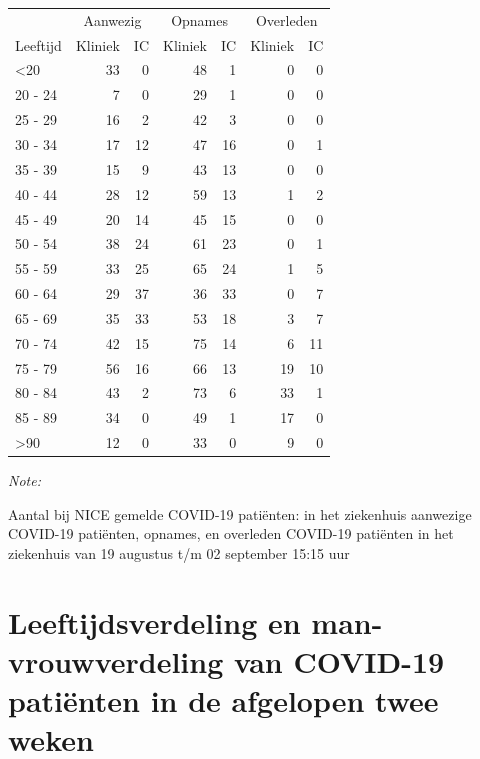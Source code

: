 \documentclass[
  english,
  man,floatsintext]{apa6}
\begin{document}
\begin{table}
\centering\begingroup\fontsize{10}{12}\selectfont

\begin{threeparttable}
\begin{tabular}{lrrrrrr}
\toprule
\multicolumn{1}{c}{ } & \multicolumn{2}{c}{Aanwezig} & \multicolumn{2}{c}{Opnames} & \multicolumn{2}{c}{Overleden} \\
\cmidrule(l{3pt}r{3pt}){2-3} \cmidrule(l{3pt}r{3pt}){4-5} \cmidrule(l{3pt}r{3pt}){6-7}
Leeftijd & Kliniek & IC & Kliniek & IC & Kliniek & IC\\
\midrule
<20 & 33 & 0 & 48 & 1 & 0 & 0\\
20 - 24 & 7 & 0 & 29 & 1 & 0 & 0\\
25 - 29 & 16 & 2 & 42 & 3 & 0 & 0\\
30 - 34 & 17 & 12 & 47 & 16 & 0 & 1\\
35 - 39 & 15 & 9 & 43 & 13 & 0 & 0\\
40 - 44 & 28 & 12 & 59 & 13 & 1 & 2\\
45 - 49 & 20 & 14 & 45 & 15 & 0 & 0\\
50 - 54 & 38 & 24 & 61 & 23 & 0 & 1\\
55 - 59 & 33 & 25 & 65 & 24 & 1 & 5\\
60 - 64 & 29 & 37 & 36 & 33 & 0 & 7\\
65 - 69 & 35 & 33 & 53 & 18 & 3 & 7\\
70 - 74 & 42 & 15 & 75 & 14 & 6 & 11\\
75 - 79 & 56 & 16 & 66 & 13 & 19 & 10\\
80 - 84 & 43 & 2 & 73 & 6 & 33 & 1\\
85 - 89 & 34 & 0 & 49 & 1 & 17 & 0\\
>90 & 12 & 0 & 33 & 0 & 9 & 0\\
\bottomrule
\end{tabular}
\begin{tablenotes}
\item \textit{Note: } 
\item Aantal bij NICE gemelde COVID-19 patiënten: in het ziekenhuis aanwezige COVID-19 patiënten, opnames, en overleden COVID-19 patiënten in het ziekenhuis van 19 augustus t/m 02 september 15:15 uur
\end{tablenotes}
\end{threeparttable}
\endgroup{}
\end{table}

\newpage

\hypertarget{leeftijdsverdeling-en-man-vrouwverdeling-van-covid-19-patiuxebnten-in-de-afgelopen-twee-weken}{%
\section{Leeftijdsverdeling en man-vrouwverdeling van COVID-19 patiënten in de afgelopen twee weken}\label{leeftijdsverdeling-en-man-vrouwverdeling-van-covid-19-patiuxebnten-in-de-afgelopen-twee-weken}}
\end{document}
